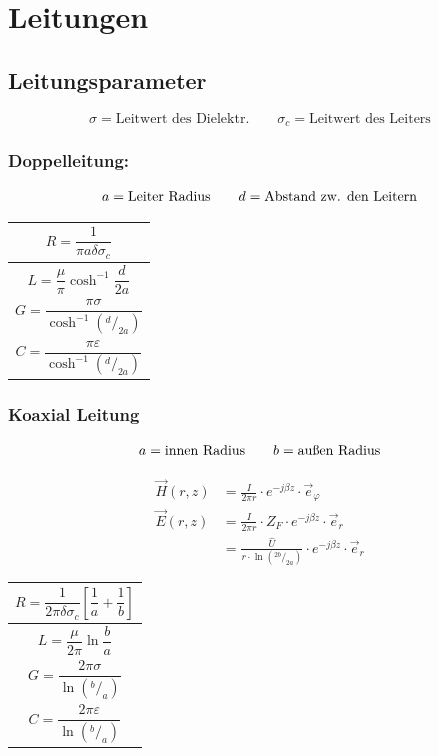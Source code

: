 \section{Leitungen}
\subsection{Leitungsparameter}

{\small\[
        \sigma = \text{Leitwert des Dielektr.} \qquad \sigma_c = \text{Leitwert des Leiters}
    \]}

\subsubsection{Doppelleitung:}
{\small\[
        a = \text{Leiter Radius} \qquad d = \text{Abstand zw. den Leitern} \\
    \]}


{\renewcommand*{\arraystretch}{0.2}
    \begin{tabularx}{0.5\columnwidth}{|X|}
        \hline
        \[R  = \frac{1}{\pi a\delta\sigma_c}\]              \\
        \hline
        \[L = \frac{\mu}{\pi} \cosh^{-1}\frac{d}{2a}\]      \\
        \hline
        \[G = \frac{\pi\sigma}{\cosh^{-1}(^d/_{2a})}\]      \\
        \hline
        \[C = \frac{\pi\varepsilon}{\cosh^{-1}(^d/_{2a})}\] \\
        \hline
    \end{tabularx}}

\subsubsection{Koaxial Leitung}
{\small\[
        a = \text{innen Radius} \qquad b = \text{außen Radius} \\
    \]}

\begin{align*}
    \vec{H}(r, z) & = \frac{I}{2\pi r}\cdot e^{-j\beta z}\cdot\vec{e}_\varphi                    \\
    \vec{E}(r, z) & = \frac{I}{2\pi r}\cdot Z_F\cdot e^{-j\beta z} \cdot\vec{e}_r                \\
                  & = \frac{\hat{U}}{r \cdot\ln{(^{2b}/_{2a})}}\cdot e^{-j\beta z}\cdot\vec{e}_r
\end{align*}


{\renewcommand*{\arraystretch}{0.2}
    \begin{tabularx}{0.5\columnwidth}{|X|}
        \hline
        \[R=\frac{1}{2\pi\delta\sigma_c}\left[\frac{1}{a}+\frac{1}{b}\right]\] \\
        \hline
        \[L=\frac{\mu}{2\pi}\ln\frac{b}{a}\]                                   \\
        \hline
        \[G=\frac{2\pi\sigma}{\ln(^b/_a)}\]                                    \\
        \hline
        \[C=\frac{2\pi\varepsilon}{\ln(^b/_a)}\]                               \\
        \hline
    \end{tabularx}}

